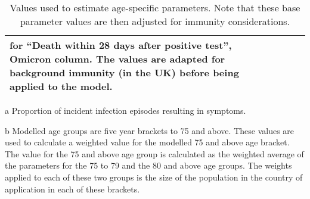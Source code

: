 \begin{table}
\begin{threeparttable}
\begin{tabularx}{\textwidth}{| X | X | X | X | X |}
        for ``Death within 28 days after positive test'', Omicron column.
        The values are adapted for background immunity (in the UK) before being applied to the
        model. \\
        \hline
	\end{tabularx}
	\caption{Values used to estimate age-specific parameters.
    Note that these base parameter values are then adjusted for immunity considerations.}
	\label{tab:age_params}
    \begin{tablenotes}
        \item[a] Proportion of incident infection episodes resulting in symptoms.
        \item[b] Modelled age groups are five year brackets to 75 and above.
        These values are used to calculate a weighted value 
        for the modelled 75 and above age bracket.
        The value for the 75 and above age group 
        is calculated as the weighted average 
        of the parameters for the 75 to 79 and the 80 and above age groups.
        The weights applied to each of these two groups 
        is the size of the population in the country of application in each of these brackets.
    \end{tablenotes}
    \end{threeparttable}
\end{table}
